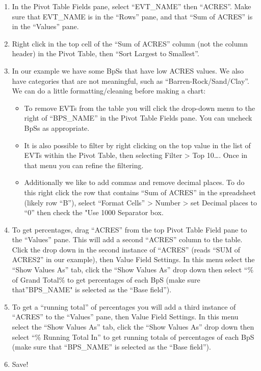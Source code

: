 \documentclass[
]{book}
\providecommand{\tightlist}{%
  \setlength{\itemsep}{0pt}\setlength{\parskip}{0pt}}
\begin{document}
\begin{enumerate}
\def\labelenumi{\arabic{enumi}.}
\tightlist
\item
  In the Pivot Table Fields pane, select ``EVT\_NAME'' then ``ACRES''. Make sure that EVT\_NAME is in the ``Rows'' pane, and that ``Sum of ACRES'' is in the ``Values'' pane.\\
\item
  Right click in the top cell of the ``Sum of ACRES'' column (not the column header) in the Pivot Table, then ``Sort Largest to Smallest''.
\item
  In our example we have some BpSs that have low ACRES values. We also have categories that are not meaningful, such as ``Barren-Rock/Sand/Clay''. We can do a little formatting/cleaning before making a chart:

  \begin{itemize}
  \tightlist
  \item
    To remove EVTs from the table you will click the drop-down menu to the right of ``BPS\_NAME'' in the Pivot Table Fields pane. You can uncheck BpSs as appropriate.
  \item
    It is also possible to filter by right clicking on the top value in the list of EVTs within the Pivot Table, then selecting Filter \textgreater{} Top 10\ldots. Once in that menu you can refine the filtering.
  \item
    Additionally we like to add commas and remove decimal places. To do this right click the row that contains ``Sum of ACRES'' in the spreadsheet (likely row ``B''), select ``Format Cells'' \textgreater{} Number \textgreater{} set Decimal places to ``0'' then check the "Use 1000 Separator box.
  \end{itemize}
\item
  To get percentages, drag ``ACRES'' from the top Pivot Table Field pane to the ``Values'' pane. This will add a second ``ACRES'' column to the table. Click the drop down in the second instance of ``ACRES'' (reads ``SUM of ACRES2'' in our example), then Value Field Settings. In this menu select the ``Show Values As'' tab, click the ``Show Values As'' drop down then select ``\% of Grand Total\% to get percentages of each BpS (make sure that''BPS\_NAME" is selected as the ``Base field'').\\
\item
  To get a ``running total'' of percentages you will add a third instance of ``ACRES'' to the ``Values'' pane, then Value Field Settings. In this menu select the ``Show Values As'' tab, click the ``Show Values As'' drop down then select ``\% Running Total In'' to get running totals of percentages of each BpS (make sure that ``BPS\_NAME'' is selected as the ``Base field'').
\item
  Save!
\end{enumerate}
\end{document}
